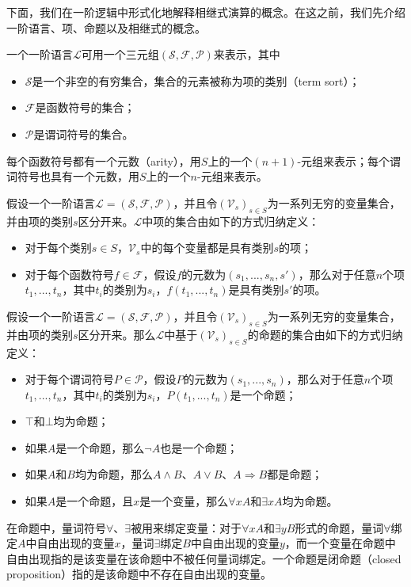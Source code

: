 下面，我们在一阶逻辑中形式化地解释相继式演算的概念。在这之前，我们先介绍一阶语言、项、命题以及相继式的概念。
\begin{definition}[一阶语言]
	一个一阶语言$\mathcal{L}$可用一个三元组$(\mathcal{S}, \mathcal{F}, \mathcal{P})$来表示，其中
	\begin{itemize}
		\item $\mathcal{S}$是一个非空的有穷集合，集合的元素被称为项的类别（term sort）；
		\item $\mathcal{F}$是函数符号的集合；
		\item $\mathcal{P}$是谓词符号的集合。
	\end{itemize}
	每个函数符号都有一个元数（arity），用$S$上的一个$(n+1)$-元组来表示；每个谓词符号也具有一个元数，用$S$上的一个$n$-元组来表示。
	
\end{definition}

\begin{definition}[项]
	假设一个一阶语言$\mathcal{L}=(\mathcal{S}, \mathcal{F}, \mathcal{P})$，并且令$(\mathcal{V}_s)_{s\in S}$为一系列无穷的变量集合，并由项的类别$s$区分开来。$\mathcal{L}$中项的集合由如下的方式归纳定义：
		\begin{itemize}
		\item 对于每个类别$s\in S$，$\mathcal{V}_s$中的每个变量都是具有类别$s$的项；
		\item 对于每个函数符号$f\in\mathcal{F}$，假设$f$的元数为$(s_1,...,s_n, s')$，那么对于任意$n$个项$t_1,...,t_n$，其中$t_i$的类别为$s_i$，$f(t_1,...,t_n)$是具有类别$s'$的项。
	\end{itemize}
\end{definition}

\begin{definition}[命题]
		假设一个一阶语言$\mathcal{L}=(\mathcal{S}, \mathcal{F}, \mathcal{P})$，并且令$(\mathcal{V}_s)_{s\in S}$为一系列无穷的变量集合，并由项的类别$s$区分开来。那么$\mathcal{L}$中基于$(\mathcal{V}_s)_{s\in S}$的命题的集合由如下的方式归纳定义：
		\begin{itemize}
			\item 对于每个谓词符号$P\in\mathcal{P}$，假设$P$的元数为$(s_1,...,s_n)$，那么对于任意$n$个项$t_1,...,t_n$，其中$t_i$的类别为$s_i$，$P(t_1,...,t_n)$是一个命题；
			\item $\top$和$\bot$均为命题；
			\item 如果$A$是一个命题，那么$\neg A$也是一个命题；
			\item 如果$A$和$B$均为命题，那么$A\wedge B$、$A\vee B$、$A\Rightarrow B$都是命题；
			\item 如果$A$是一个命题，且$x$是一个变量，那么$\forall x A$和$\exists x A$均为命题。
		\end{itemize}
	
\end{definition}
在命题中，量词符号$\forall$、$\exists$被用来绑定变量：对于$\forall x A$和$\exists y B$形式的命题，量词$\forall$绑定$A$中自由出现的变量$x$，量词$\exists$绑定$B$中自由出现的变量$y$，而一个变量在命题中自由出现指的是该变量在该命题中不被任何量词绑定。一个命题是闭命题（closed proposition）指的是该命题中不存在自由出现的变量。

